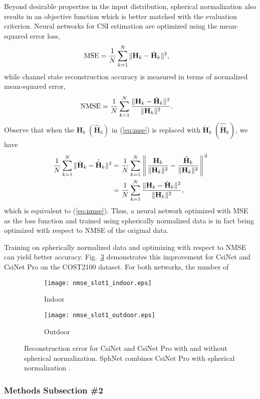 Beyond desirable properties in the input distribution, spherical normalization also results in an objective function which is better matched with the evaluation criterion. Neural networks for CSI estimation are optimized using the mean-squared error loss,
\begin{align} 
	\text{MSE}&=\frac 1N \sum_{k=1}^N\Arrowvert\mathbf H_k - \hat{\mathbf H}_k\Arrowvert^2, \label{eq:mse}
\end{align}
while channel state reconstruction accuracy is measured in terms of normalized mean-squared error,
\begin{align} 
	\text{NMSE}&=\frac 1N \sum_{k=1}^N\frac{\Arrowvert\mathbf H_k - \hat{\mathbf H}_k\Arrowvert^2}{\Arrowvert\mathbf H_k\Arrowvert^2}. \label{eq:nmse}
\end{align}
Observe that when the $\mathbf H_k \; (\hat{\mathbf H}_k)$ in (\ref{eq:mse}) is replaced with $\check{\mathbf H}_k \; (\hat{\check{\mathbf H}}_k)$, we have
\begin{align*} 
	\frac 1N \sum_{k=1}^N\Arrowvert\check{\mathbf H}_k - \hat{\check{\mathbf H}}_k\Arrowvert^2&= \frac 1N \sum_{k=1}^N\left\Arrowvert \frac{\mathbf H_k}{\Arrowvert\mathbf H_k\Arrowvert^2} - \frac{\hat{\mathbf H}_k}{\Arrowvert\mathbf H_k\Arrowvert^2}\right\Arrowvert^2 \\
	&= \frac 1N \sum_{k=1}^N\frac{\Arrowvert\mathbf H_k - \hat{\mathbf H}_k\Arrowvert^2}{\Arrowvert\mathbf H_k\Arrowvert^2},
\end{align*}
which is equivalent to (\ref{eq:nmse}). Thus, a neural network optimized with MSE as the loss function and trained using spherically normalized data is in fact being optimized with respect to NMSE of the original data.

Training on spherically normalized data and optimizing with respect to NMSE can yield better accuracy. Fig.~\ref{fig:nmse_slot1} demonstrates this improvement for CsiNet and CsiNet Pro on the COST2100 dataset. For both networks, the number of 

\begin{figure}[!hbtp] \centering 
	\begin{subfigure}[t]{.45\textwidth}
		\centering
		\texttt{[image: nmse\_slot1\_indoor.eps]}
		\caption{Indoor}
		\label{fig:slot1_indoor} 
	\end{subfigure}
	\begin{subfigure}[t]{.45\textwidth}
		\centering
		\texttt{[image: nmse\_slot1\_outdoor.eps]}
		\caption{Outdoor}
		\label{fig:slot1_outdoor} 
	\end{subfigure}
	\caption{Reconstruction error for CsiNet \cite{ref:csinet} and CsiNet Pro with and without spherical normalization. SphNet combines CsiNet Pro with spherical normalization \cite{ref:liu2020sphnet}.}
	\label{fig:nmse_slot1} 
\end{figure}

\subsubsection{Methods Subsection \#2}
\label{sect:methods_sub2}

\blindtext

